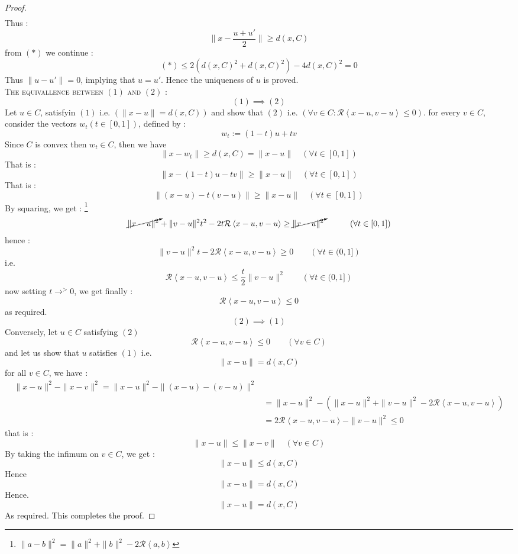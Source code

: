 \begin{proof}
\begin{align*}
\end{align*}
Thus : 
\[
\| x- \frac{u + u'}{2} \|  
\geq d(x,C) 
\]
from $(*)$ we continue : 
\[
 (*) \leq  
 2 \left( 
   d(x,C) ^2  + 
   d(x,C) ^2 
 \right)- 4 
 d(x,C) ^2  = 0
\]
Thus $\| u-u' \| = 0$, implying that 
$u = u' $. Hence the uniqueness of $u $ is proved. 
\\
\textsc{The equivallence between $(1)  $ and $(2)  $ :}
\\
\[
  (1)  \implies (2) 
\]
Let $u \in  C $, satisfyin $(1)$ i.e. $(\| x-u \| = d(x,C) )  $ and 
show that $(2)$ i.e. $(\forall v \in  C : 
\mathcal{R} \left\langle x-u, v-u \right\rangle \leq 0)$. for every 
$v \in  C $, consider the vectors $w_{t} (t \in  [0,1])  $, defined by : 
\[
w_{t} := 
(1-t) u + t v
\]
Since $C $ is convex then $w_{t} \in C $, then we have 
\[
  \| x-w_{t} \|  \geq  d(x, C) = \| x-u \|  \quad 
  \left( \forall  t \in  [0,1] \right)
\]
That is : 
\[
\| x - (1-t)u - tv  \|  
\geq \| x-u \|  \quad \left( \forall  t \in [0,1] \right)
\]
That is : 
\[
\|(x-u) - t(v-u)  \|  \geq 
\| x-u \|  \quad \left( 
  \forall t \in  [0,1]
\right)
\]
By squaring, we get : \footnote{
  $\| a-b \| ^2  = \| a \| ^2  + \| b \| ^2  - 
  2 \mathcal{R} \left\langle a,b \right\rangle $ 
}
\begin{align*}
\cancelto{}{
\| x-u \| ^2 
} 
+ 
\| v-u \| ^2 t ^2 
- 2 t \mathcal{R} 
\left\langle x -u, v -u \right\rangle  
\geq 
\cancelto{}{
\| x-u \| ^2 
}  \quad \quad \quad 
\left( \forall t \in  [0,1] \right)
\end{align*}
hence : 
\[
\| v-u \| ^2  t - 2 \mathcal{R} 
\left\langle 
  x-u, v-u
\right\rangle  \geq 0 \quad 
\quad \left( 
  \forall  t \in  (0,1]
\right)
\]
i.e. 
\[
\mathcal{R} \left\langle 
  x-u, v-u
\right\rangle  \leq 
\frac{t}{2}
\| v-u \| ^2  \quad \quad 
\left( 
  \forall t \in (0,1]
\right)
\]
now setting $t \rightarrow^{>} 0 $, we get finally : 
\[
\mathcal{R} \left\langle 
  x-u, v-u
\right\rangle  \leq 0
\]
as required. 
\[
(2)  \implies (1)   
\]
Conversely, let $u \in  C $ satisfying $(2)$ 
\[
  \mathcal{R} \left\langle x-u, v-u \right\rangle  \leq 0 \quad 
  \quad \left( \forall v \in  C \right)
\]
and let us show that $u $ satisfies $(1)$ i.e. 
\[
\| x-u \|  = d(x,C)  
\]
for all $v \in  C $, we have : 
\begin{align*}
\| x-u \| ^2  - 
\| x-v \| ^2  = 
\| x-u \| ^2  - 
\| (x-u)  -(v-u)  \| ^2  
\\
&= 
\| x-u \| ^2  - 
\left( 
  \| x-u \| ^2  
  + \| v-u \| ^2  
  - 2 \mathcal{R} 
  \left\langle x-u, v-u \right\rangle 
\right) 
\\
&=
2 \mathcal{R} 
\left\langle 
  x-u, v-u
\right\rangle  - 
\| v-u \| ^2 
\leq  0
\end{align*} 
that is : 
\[
\| x-u \| \leq 
\| x-v \|  \quad 
\left( 
  \forall  v \in  C
\right)
\]
By taking the infimum on $v \in C $, we get :
\[
\| x-u \|  
\leq d(x,C) 
\]
Hence 
\[
\| x-u \| = d(x,C) 
\] 
Hence. 
\[
\| x-u \| = d(x,C) 
\]
As required. This completes the proof.
\end{proof}

